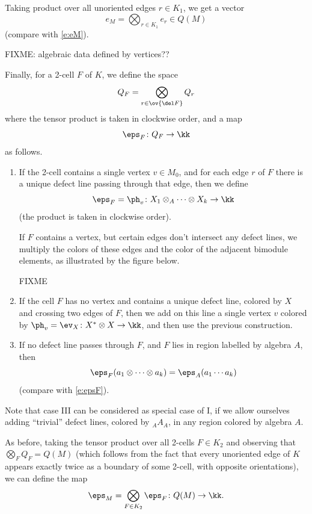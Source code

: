 \begin{defectfiguresetup}
Taking product over all unoriented edges $r\in K_1$, we get a vector
$$
e_M=\bigotimes_{r\in K_1} e_r\in Q(M)
$$
(compare with \eqref{e:eM}).


FIXME: algebraic data defined by vertices??


Finally, for a 2-cell $F$ of $K$, we define the space
$$
Q_F=\bigotimes_{r\in \ov{\del F}}Q_r
$$
where the tensor product is taken in clockwise order, and
a map
$$
\eps_F \colon Q_F\to \kk
$$
as follows.

\begin{enumerate}
	\item[I.]
    If the 2-cell contains a single vertex $v\in M_0$, and for each edge $r$ of
    $F$ there is a unique defect line passing through that edge, then we
    define
    \begin{equation}
      \eps_F=\ph_v\colon X_1\otimes_{A}\dots \otimes X_k\to \kk
		\end{equation}
    (the product is taken in clockwise order).

    If $F$ contains a vertex, but certain edges don't intersect any defect
    lines, we multiply the colors of these edges and the color of the adjacent
    bimodule elements, as illustrated by the figure below.

FIXME

  \item[II.]
    If the cell $F$ has no vertex and contains a unique defect line, colored by
    $X$ and crossing two edges of $F$, then we add on this line a single vertex
    $v$ colored by $\ph_v=\ev_X\colon X^*\otimes X\to \kk$, and then use the
    previous construction.

	\item[III.] If no defect line passes through $F$, and $F$ lies in region
    labelled by algebra $A$, then
    $$
    \eps_F(a_1 \otimes \cdots\otimes  a_k) = \eps_{A}(a_1 \cdots a_k)
    $$
    (compare with \eqref{e:epsF}).
\end{enumerate}

Note that case  III can be considered as special case of I, if we allow
ourselves adding ``trivial'' defect lines, colored by ${}_AA_A$,  in any region
colored by algebra $A$.

As before, taking the tensor product over all 2-cells  $F\in K_2$ and observing
that $\bigotimes_F Q_F=Q(M)$ (which follows from the fact that every unoriented
edge of $K$ appears exactly twice as a boundary of some 2-cell, with opposite
orientations), we can define the map
$$
\eps_M=\bigotimes_{F\in K_2} \eps_F \colon Q(M)\to \kk.
$$


\end{defectfiguresetup}

